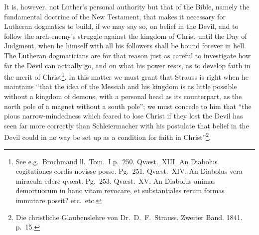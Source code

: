 \documentclass[12pt,a4paper]{article}
\newcommand{\opage}[1]{\marginnote{\footnotesize\textit{[#1]}}}
\begin{document}
It is, however, not Luther's personal authority but that of the Bible,
namely the fundamental doctrine of the New Testament, that makes it
necessary for Lutheran dogmatics to build, if we may say so, on belief in
the Devil, and to follow the arch-enemy's struggle against the kingdom of
Christ until the Day of Judgment, when he himself with all his followers
shall be bound forever in hell. The Lutheran dogmaticians are for that
reason just as careful to investigate how far the Devil can actually
\opage{24}go, and on what his power rests, as to develop faith in the merit of
Christ\footnote{See e.g.\ Brochmand ll.\ Tom.\ I p.\ 250. Qvæst.\ XIII. An Diabolus
cogitationes cordis novisse posse. Pg.\ 251. Qvæst.\ XIV. An Diabolus vera
miracula edere qvæat. Pg.\ 253. Qvæst.\ XV. An Diabolus
animas demortuorum in hanc vitam revocare, et substantiales rerum
formas immutare possit? etc.\ etc.}. %
In this matter we must grant that Strauss is right when he maintains ``that
the idea of the Messiah and his kingdom is as little possible without a
kingdom of demons, with a personal head as its counterpart, as the north
pole of a magnet without a south pole''; we must concede to him that ``the
pious narrow-mindedness which feared to lose Christ if they lost the Devil
has seen far more correctly than Schleiermacher with his postulate that
belief in the Devil could in no way be set up as a condition for faith in
Christ''\footnote{Die christliche Glaubenslehre von Dr.\ D.\ F.\ Strauss. Zweiter Band.
1841. p.\ 15.}. %
\end{document}

